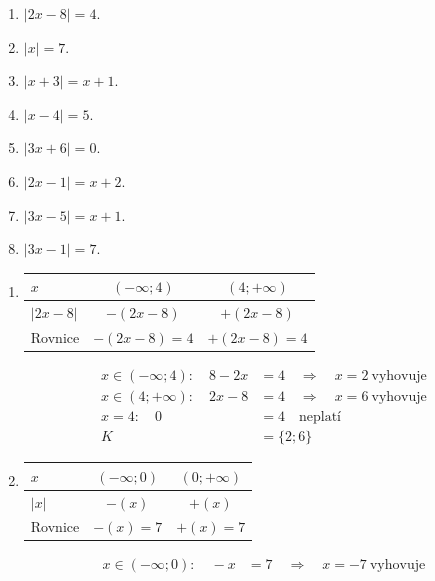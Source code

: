 \documentclass[11pt,a4paper]{article}
\begin{document}
\begin{zadaniReseniBox}[title={Domácí úkol}]
\begin{enumerate}[label=\alph*),itemsep=2pt]
\item $|2x-8|=4$.
\item $|x|=7$.
\item $|x+3|=x+1$.
\item $|x-4|=5$.
\item $|3x+6|=0$.
\item $|2x-1|=x+2$.
\item $|3x-5|=x+1$.
\item $|3x-1|=7$.
\end{enumerate}
\tcblower
\begin{enumerate}[label=\alph*),itemsep=1pt]
\item
\begin{center}
\begingroup\footnotesize
\renewcommand{\arraystretch}{1.32}
\begin{tabular}{@{}lcc@{}}
\toprule
$x$ & $(-\infty;4)$ & $(4;+\infty)$ \\
\midrule
$|2 x - 8|$ & $-(2 x - 8)$ & $+(2 x - 8)$ \\
\midrule
Rovnice & $-(2 x - 8)=4$ & $+(2 x - 8)=4$ \\
\bottomrule
\end{tabular}
\endgroup
\end{center}
\[\begin{aligned}x\in (-\infty;4):\quad 8 - 2 x &= 4\quad\Longrightarrow\quad x=2\ \text{vyhovuje}\\[2pt]
x\in (4;+\infty):\quad 2 x - 8 &= 4\quad\Longrightarrow\quad x=6\ \text{vyhovuje}\\[2pt]
x=4:\quad 0 &= 4\quad\text{neplatí}\\[2pt]
K&=\{2;6\}\end{aligned}\]
\item
\begin{center}
\begingroup\footnotesize
\renewcommand{\arraystretch}{1.32}
\begin{tabular}{@{}lcc@{}}
\toprule
$x$ & $(-\infty;0)$ & $(0;+\infty)$ \\
\midrule
$|x|$ & $-(x)$ & $+(x)$ \\
\midrule
Rovnice & $-(x)=7$ & $+(x)=7$ \\
\bottomrule
\end{tabular}
\endgroup
\end{center}
\[\begin{aligned}x\in (-\infty;0):\quad - x &= 7\quad\Longrightarrow\quad x=-7\ \text{vyhovuje}\\[2pt]

\end{aligned}\]
\end{enumerate}
\end{zadaniReseniBox}
\end{document}

